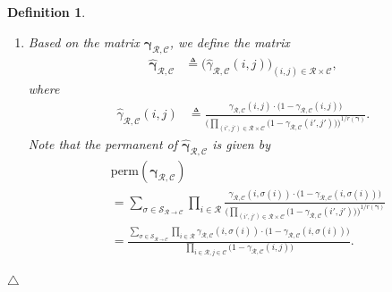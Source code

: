 \documentclass[journal,lettersize,twocolumn]{IEEEtran} %
\newtheorem{definition}[theorem]{Definition}
\newcommand{\edefinition}{\hfill$\triangle$}
\newcommand{\vect}[1]{ \bm{#1} }
\newcommand{\set}[1]{\mathcal{#1}}
\newcommand{\vgam}{ \vect{\gamma} }
\newcommand{\defeq}{ \triangleq }
\newcommand{\perm}{ \mathrm{perm} }
\newcommand{\setC}{\set{C}}
\newcommand{\setR}{\set{R}}
\newcommand{\setS}{\set{S}}
\newcommand{\vgamRCp}{\vgam_{\setR,\setC}}
\newcommand{\gamRCp}{\gamma_{\setR,\setC}}
\newcommand{\hvgamRCp}{ \hat{\vgam}_{\setR,\setC} }
\newcommand{\hgamRCp}{ \hat{\gamma}_{\setR,\setC} }
\begin{document}
\begin{definition}
\begin{enumerate}
\begin{itemize}
  \end{itemize}

  \item Based on the matrix $\vgamRCp$, we define the matrix
    \begin{align*}
      \hvgamRCp
        &\defeq
           \bigl(
             \hgamRCp(i,j)
           \bigr)_{(i,j) \in \setR \times \setC},
    \end{align*}
    where
    \begin{align*}
      \hgamRCp(i,j)
        &\defeq 
          \frac{\gamRCp(i,j) \cdot \bigl( 1- \gamRCp(i,j) \bigr)}
               {\Biggl(
                  \prod\limits_{(i',j') \in \setR \times \setC} 
                     \bigl( 1 - \gamRCp(i',j') \bigr)
                \Biggr)^{\!\! 1 / r(\vgam)}
               }.
    \end{align*}
    Note that the permanent of $ \hvgamRCp $ is given by
    \begin{align}
      &\perm(\hvgamRCp) \nonumber \\
        &= \sum\limits_{\sigma \in \setS_{\setR\to\setC} }
             \prod_{i \in \setR}
               \frac{\gamRCp(i,\sigma(i)) 
                     \cdot
                     \bigl( 1- \gamRCp(i,\sigma(i)) \bigr)
                    }
                 {\Biggl(
                    \prod\limits_{(i',j') \in \setR \times \setC} 
                       \bigl( 1 - \gamRCp(i',j') \bigr)
                  \Biggr)^{\!\! 1 / r(\vgam)}
                 } \\
        &= \frac{ 
                  \sum\limits_{\sigma \in \setS_{\setR\to\setC} }
                    \prod\limits_{i \in \setR}
                      \gamRCp(i,\sigma(i))
                      \cdot
                      \bigl( 1- \gamRCp(i,\sigma(i)) \bigr)
                }
                { 
                  \prod_{i \in \setR,j \in \setC}
                    \bigl( 1- \gamRCp(i,j) \bigr) 
                }.
        \label{eqn: permament of hvgamRCp}
    \end{align}

  \end{enumerate}
  \edefinition
\end{definition}

%
\end{document}
